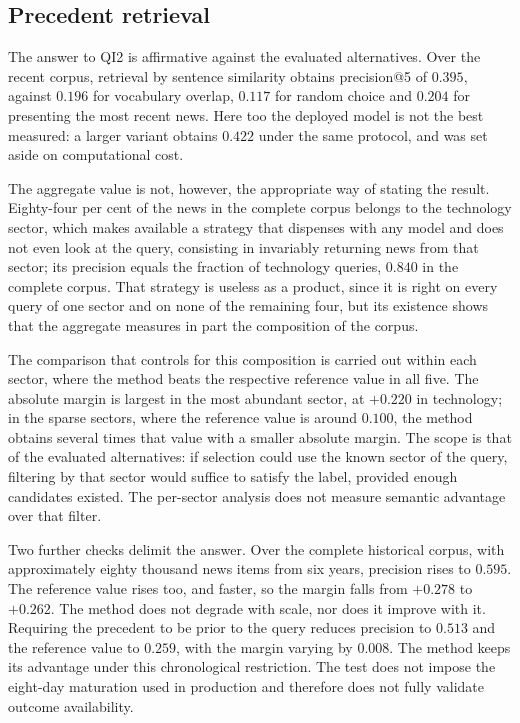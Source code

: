 \subsection{Precedent retrieval}
\label{sec:con_qi2}

The answer to \gls{QI}2 is affirmative against the evaluated alternatives. Over the
recent corpus, retrieval by sentence similarity \autocite{reimers2019sbert} obtains precision@5 of
$0.395$, against $0.196$ for vocabulary overlap, $0.117$ for random choice and $0.204$ for
presenting the most recent news. Here too the deployed model is not the best measured: a larger
variant obtains $0.422$ under the same protocol, and was set aside on computational cost.

The aggregate value is not, however, the appropriate way of stating the result. Eighty-four per cent of the
news in the complete corpus belongs to the technology sector, which makes available a strategy that
dispenses with any model and does not even look at the query, consisting in invariably returning
news from that sector; its precision equals the fraction of technology queries, $0.840$ in the complete corpus. That
strategy is useless as a product, since it is right on every query of one sector and on none of the
remaining four, but its existence shows that the aggregate measures in part the composition of the
corpus.

The comparison that controls for this composition is carried out within each sector, where the method
beats the respective reference value in all five. The absolute margin is largest in the most
abundant sector, at $+0.220$ in technology; in the sparse sectors, where the reference value is
around $0.100$, the method obtains several times that value with a smaller absolute margin. The
scope is that of the evaluated alternatives: if selection could use the known sector of the query,
filtering by that sector would suffice to satisfy the label, provided enough candidates existed.
The per-sector analysis does not measure semantic advantage over that filter.

Two further checks delimit the answer. Over the complete historical corpus, with approximately
eighty thousand news items from six years, precision rises to $0.595$. The reference value rises
too, and faster, so the margin falls from $+0.278$ to $+0.262$. The method does not degrade with
scale, nor does it improve with it. Requiring the precedent to be prior to the query reduces precision to $0.513$
and the reference value to $0.259$, with the margin varying by $0.008$. The method keeps its
advantage under this chronological restriction. The test does not impose the eight-day maturation
used in production and therefore does not fully validate outcome availability.

